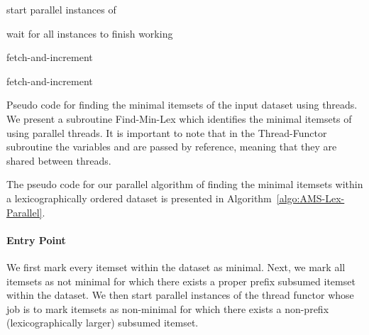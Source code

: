 \documentclass[13pt,a4paper]{article}
\begin{document}
\begin{algorithm} [t]
\SetAlgoNoLine
{}
\func{\findMinLex{ ,  }}
{
	\nl \;
	
	\nl \;
	
	\nl \For{ \KwTo }
	{
		\nl \If{}
		{
			\nl \;
		}
		\Else
		{
			\nl \;
		}
	}
	
	
	\nl \;
	
	\nl start  parallel instances of \threadFunctor\;
	
	\nl wait for all  instances to finish working\;
	
	\nl \KwRet   \;
}

\func{\threadFunctor{ ,   ,  }}
{
	\nl  fetch-and-increment\;
	
	\nl \While{}
	{
		\nl {}
		{
			\nl \;
		}
		
		\nl  fetch-and-increment\;
	}
}
\caption{Pseudo code for finding the minimal itemsets  of the input dataset  using  threads. We present a subroutine Find-Min-Lex which identifies the minimal itemsets of  using  parallel threads. It is important to note that in the Thread-Functor subroutine the variables  and  are passed by reference, meaning that they are shared between threads.}
\label{algo:AMS-Lex-Parallel}
\end{algorithm}

The pseudo code for our parallel algorithm of finding the minimal itemsets within a lexicographically ordered dataset is presented in Algorithm~\ref{algo:AMS-Lex-Parallel}.

\paragraph{Entry Point}
We first mark every itemset within the dataset  as minimal. Next, we mark all itemsets as not minimal for which there exists a proper prefix subsumed itemset within the dataset. We then start  parallel instances of the thread functor whose job is to mark itemsets as non-minimal for which there exists a non-prefix (lexicographically larger) subsumed itemset. 
\end{document}
